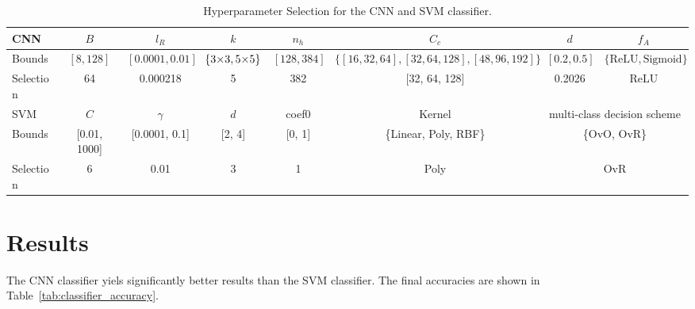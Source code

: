 \documentclass[a4, 10 pt, conference]{ieeeconf}  %
\begin{document}
\begin{table}[b]
  \centering
  \begin{tabular}{|l|c|c|c|c|c|c|c|}
    \hline
    CNN       & $B$          & $l_R$            & $k$                                            & $n_h$       & $C_c$                                    & $d$                                              & $f_A$                             \\
    \hline
    Bounds    & $[8,128]$    & $[0.0001, 0.01]$ & $\{\text{3\texttimes3}, \text{5\texttimes5}\}$ & $[128,384]$ & $\{[16,32,64],[32,64,128],[48,96,192]\}$ & $[0.2,0.5]$                                      & $\{\text{ReLU}, \text{Sigmoid}\}$ \\
    Selection & 64           & 0.000218         & 5\texttimes5                                   & 382         & [32, 64, 128]                            & 0.2026                                           & ReLU                              \\
    \hline
    SVM       & $C$          & $\gamma$         & $d$                                            & coef0       & Kernel                                   & \multicolumn{2}{c|}{multi-class decision scheme}                                     \\
    \hline
    Bounds    & [0.01, 1000] & [0.0001, 0.1]    & [2, 4]                                         & [0, 1]      & \{Linear, Poly, RBF\}                    & \multicolumn{2}{c|}{\{OvO, OvR\}}                                                    \\
    Selection & 6            & 0.01             & 3                                              & 1           & Poly                                     & \multicolumn{2}{c|}{OvR}                                                             \\
    \hline
  \end{tabular}
  \caption{Hyperparameter Selection for the CNN and SVM classifier.}
  \label{fig:hyperparameter_selection}
\end{table}

\section{Results}
\label{sec:results}

The CNN classifier yiels significantly better results than the SVM classifier.
The final accuracies are shown in Table~\ref{tab:classifier_accuracy}.
\end{document}
